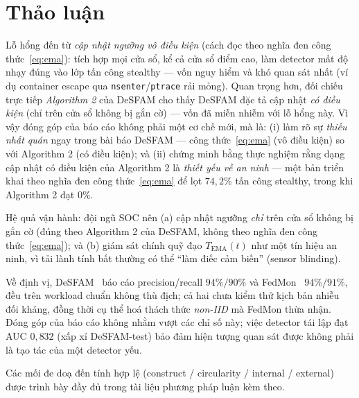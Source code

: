 \section{Thảo luận}\label{sec:discuss}

Lỗ hổng đến từ \textit{cập nhật ngưỡng vô điều kiện} (cách đọc theo nghĩa đen công thức~\eqref{eq:ema}): tích hợp mọi cửa sổ, kể cả cửa sổ điểm cao, làm detector mất độ nhạy đúng vào lớp tấn công stealthy — vốn nguy hiểm và khó quan sát nhất (ví dụ container escape qua \texttt{nsenter}/\texttt{ptrace} rải mỏng). Quan trọng hơn, đối chiếu trực tiếp \textit{Algorithm 2} của DeSFAM cho thấy DeSFAM đặc tả cập nhật \textit{có điều kiện} (chỉ trên cửa sổ không bị gắn cờ) — vốn đã miễn nhiễm với lỗ hổng này. Vì vậy đóng góp của báo cáo không phải một cơ chế mới, mà là: (i) làm rõ sự \textit{thiếu nhất quán} ngay trong bài báo DeSFAM — công thức~\eqref{eq:ema} (vô điều kiện) so với Algorithm 2 (có điều kiện); và (ii) chứng minh bằng thực nghiệm rằng dạng cập nhật có điều kiện của Algorithm 2 là \textit{thiết yếu về an ninh} — một bản triển khai theo nghĩa đen công thức~\eqref{eq:ema} để lọt $74{,}2\%$ tấn công stealthy, trong khi Algorithm 2 đạt $0\%$.

Hệ quả vận hành: đội ngũ SOC nên (a) cập nhật ngưỡng \textit{chỉ} trên cửa sổ không bị gắn cờ (đúng theo Algorithm 2 của DeSFAM, không theo nghĩa đen công thức~\eqref{eq:ema}); và (b) giám sát chính quỹ đạo $T_{\text{EMA}}(t)$ như một tín hiệu an ninh, vì tải lành tính bất thường có thể ``làm điếc cảm biến'' (sensor blinding).

Về định vị, DeSFAM~\cite{desfam_original} báo cáo precision/recall $94\%/90\%$ và FedMon~\cite{fedmon2025} $94\%/91\%$, đều trên workload chuẩn không thù địch; cả hai chưa kiểm thử kịch bản nhiễu đối kháng, đồng thời cụ thể hoá thách thức \textit{non-IID} mà FedMon thừa nhận. Đóng góp của báo cáo không nhằm vượt các chỉ số này; việc detector tái lập đạt AUC $0{,}832$ (xấp xỉ DeSFAM-test) bảo đảm hiện tượng quan sát được không phải là tạo tác của một detector yếu.

Các mối đe doạ đến tính hợp lệ (construct / circularity / internal / external) được trình bày đầy đủ trong tài liệu phương pháp luận kèm theo.

